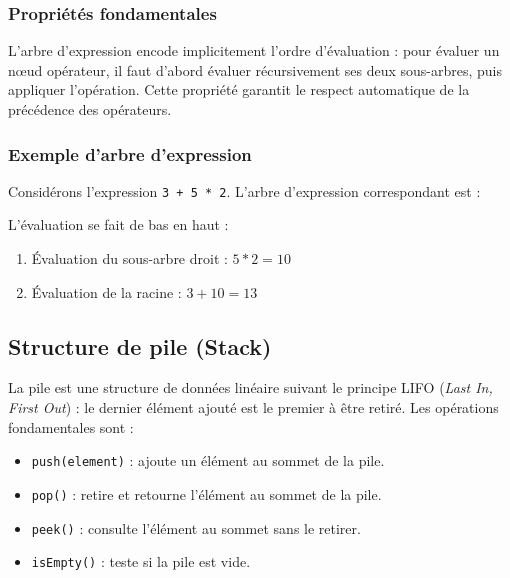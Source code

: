 \documentclass[12pt,a4paper]{article}
\begin{document}
\subsubsection{Propriétés fondamentales}

L'arbre d'expression encode implicitement l'ordre d'évaluation : pour évaluer un nœud opérateur, il faut d'abord évaluer récursivement ses deux sous-arbres, puis appliquer l'opération. Cette propriété garantit le respect automatique de la précédence des opérateurs.

\subsubsection{Exemple d'arbre d'expression}

Considérons l'expression \texttt{3 + 5 * 2}. L'arbre d'expression correspondant est :

\begin{center}
\end{center}

L'évaluation se fait de bas en haut :
\begin{enumerate}
    \item Évaluation du sous-arbre droit : $5 * 2 = 10$
    \item Évaluation de la racine : $3 + 10 = 13$
\end{enumerate}

\subsection{Structure de pile (Stack)}

La pile est une structure de données linéaire suivant le principe LIFO (\textit{Last In, First Out}) : le dernier élément ajouté est le premier à être retiré. Les opérations fondamentales sont :
\begin{itemize}
    \item \texttt{push(element)} : ajoute un élément au sommet de la pile.
    \item \texttt{pop()} : retire et retourne l'élément au sommet de la pile.
    \item \texttt{peek()} : consulte l'élément au sommet sans le retirer.
    \item \texttt{isEmpty()} : teste si la pile est vide.
\end{itemize}
\end{document}
